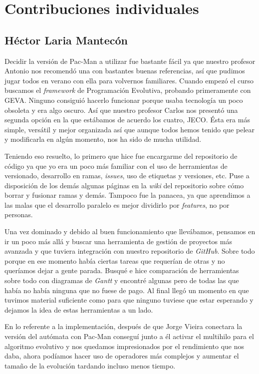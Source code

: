 \chapter{Contribuciones individuales}

\section{Héctor Laria Mantecón}
Decidir la versión de Pac-Man a utilizar fue bastante fácil ya que nuestro profesor Antonio nos recomendó una con bastantes buenas referencias, así que pudimos jugar todos en verano con ella para volvernos familiares. Cuando empezó el curso buscamos el \textit{framework} de Programación Evolutiva, probando primeramente con GEVA. Ninguno consiguió hacerlo funcionar porque usaba tecnología un poco obsoleta y era algo oscuro. Así que nuestro profesor Carlos nos presentó una segunda opción en la que estábamos de acuerdo los cuatro, JECO. Ésta era más simple, versátil y mejor organizada así que aunque todos hemos tenido que pelear y modificarla en algún momento, nos ha sido de mucha utilidad.

Teniendo eso resuelto, lo primero que hice fue encargarme del repositorio de código ya que yo era un poco más familiar con el uso de herramientas de versionado, desarrollo en ramas, \textit{issues}, uso de etiquetas y versiones, etc. Puse a disposición de los demás algunas páginas en la \textit{wiki} del repositorio sobre cómo borrar y fusionar ramas y demás. Tampoco fue la panacea, ya que aprendimos a las malas que el desarrollo paralelo es mejor dividirlo por \textit{features}, no por personas.

Una vez dominado y debido al buen funcionamiento que llevábamos, pensamos en ir un poco más allá y buscar una herramienta de gestión de proyectos más avanzada y que tuviera integración con nuestro repositorio de \textit{GitHub}. Sobre todo porque en ese momento había ciertas tareas que requerían de otras y no queríamos dejar a gente parada. Busqué e hice comparación de herramientas sobre todo con diagramas de \textit{Gantt} y encontré algunas pero de todas las que había no había ninguna que no fuese de pago. Al final llegó un momento en que tuvimos material suficiente como para que ninguno tuviese que estar esperando y dejamos la idea de estas herramientas a un lado.

En lo referente a la implementación, después de que Jorge Vieira conectara la versión del autómata con Pac-Man conseguí junto a él activar el multihilo para el algoritmo evolutivo y nos quedamos impresionados por el rendimiento que nos daba, ahora podíamos hacer uso de operadores más complejos y aumentar el tamaño de la evolución tardando incluso menos tiempo.

